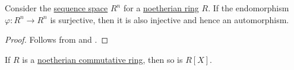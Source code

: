 \begin{proposition}\label{thm:surjective_endomorphism_in_free_module}
  Consider the \hyperref[def:sequence_space]{sequence space} \( R^n \) for a \hyperref[def:noetherian_semiring]{noetherian ring} \( R \). If the endomorphism \( \varphi: R^n \to R^n \) is surjective, then it is also injective and hence an automorphism.
\end{proposition}
\begin{proof}
  Follows from  and .
\end{proof}

\begin{theorem}\label{thm:hilberts_basis_theorem}
  If \( R \) is a \hyperref[def:noetherian_semiring]{noetherian commutative ring}, then so is \( R[X] \).
\end{theorem}
